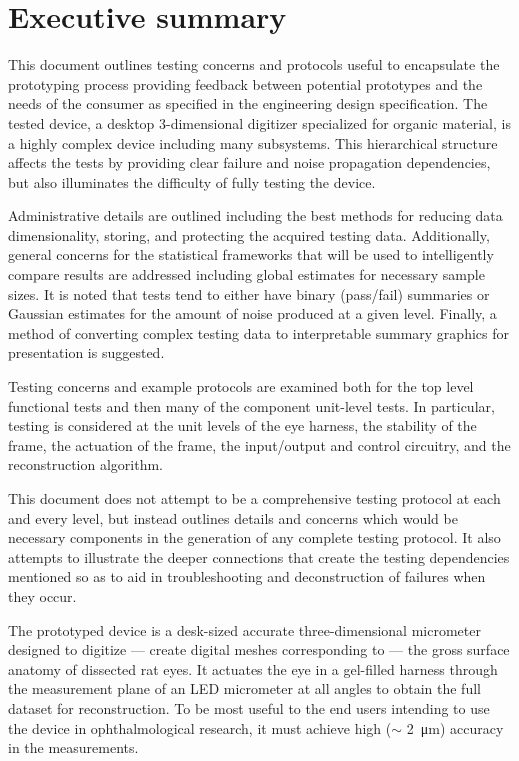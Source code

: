 \documentclass{article}
\begin{document}

\setcounter{tocdepth}{3}
\tableofcontents
\newpage

\section*{Executive summary}
\label{sec:exec-summary}

This document outlines testing concerns and protocols useful to encapsulate the prototyping process providing feedback between potential prototypes and the needs of the consumer as specified in the engineering design specification. The tested device, a desktop 3-dimensional digitizer specialized for organic material, is a highly complex device including many subsystems. This hierarchical structure affects the tests by providing clear failure and noise propagation dependencies, but also illuminates the difficulty of fully testing the device.

Administrative details are outlined including the best methods for reducing data dimensionality, storing, and protecting the acquired testing data. Additionally, general concerns for the statistical frameworks that will be used to intelligently compare results are addressed including global estimates for necessary sample sizes. It is noted that tests tend to either have binary (pass/fail) summaries or Gaussian estimates for the amount of noise produced at a given level. Finally, a method of converting complex testing data to interpretable summary graphics for presentation is suggested.

Testing concerns and example protocols are examined both for the top level functional tests and then many of the component unit-level tests. In particular, testing is considered at the unit levels of the eye harness, the stability of the frame, the actuation of the frame, the input/output and control circuitry, and the reconstruction algorithm.

This document does not attempt to be a comprehensive testing protocol at each and every level, but instead outlines details and concerns which would be necessary components in the generation of any complete testing protocol. It also attempts to illustrate the deeper connections that create the testing dependencies mentioned so as to aid in troubleshooting and deconstruction of failures when they occur.

\newpage

The prototyped device is a desk-sized accurate three-dimensional micrometer designed to digitize --- create digital meshes corresponding to --- the gross surface anatomy of dissected rat eyes. It actuates the eye in a gel-filled harness through the measurement plane of an LED micrometer at all angles to obtain the full dataset for reconstruction. To be most useful to the end users intending to use the device in ophthalmological research, it must achieve high ($\sim$ \SI{2}{\micro m}) accuracy in the measurements.
\end{document}
